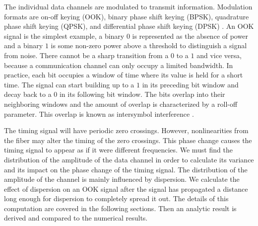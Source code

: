 
The individual data channels are modulated to transmit information.  Modulation formats are on-off keying (OOK), binary phase shift keying (BPSK), quadrature phase shift keying (QPSK), and differential phase shift keying (DPSK) \cite{agrawal2012fiber}.  An OOK signal is the simplest example, a binary $0$ is represented as the absence of power and a binary $1$ is some non-zero power above a threshold to distinguish a signal from noise.  There cannot be a sharp transition from a $0$ to a $1$ and vice versa, because a communication channel can only occupy a limited bandwidth.  In practice, each bit occupies a window of time where its value is held for a short time.  The signal can start building up to a $1$ in its preceding bit window and decay back to a $0$ in its following bit window.  The bits overlap into their neighboring windows and the amount of overlap is characterized by a roll-off parameter.  This overlap is known as intersymbol interference \cite{proakis2001digital}.

The timing signal will have periodic zero crossings.  However, nonlinearities from the fiber may alter the timing of the zero crossings.  This phase change causes the timing signal to appear as if it were different frequencies.  We must find the distribution of the amplitude of the data channel in order to calculate its variance and its impact on the phase change of the timing signal.  The distribution of the amplitude of the channel is mainly influenced by dispersion.  We calculate the effect of dispersion on an OOK signal after the signal has propagated a distance long enough for dispersion to completely spread it out.  The details of this computation are covered in the following sections.  Then an analytic result is derived and compared to the numerical results.










